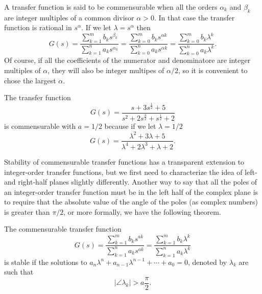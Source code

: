 \begin{definition}
  A transfer function is said to be commensurable when all the orders $\alpha_k$ and $\beta_k$ are integer multiples of a common divisor $\alpha > 0$. In that case the transfer function is rational in $s^\alpha$. If we let $\lambda = s^\alpha$ then
  \begin{equation*}
    G(s) = \frac{\sum_{k=1}^m b_k s^{\beta_k}}{\sum_{k=1}^n a_k s^{\alpha_k}} = \frac{\sum_{k=0}^m b_k s^{\alpha k}}{\sum_{k=0}^n a_k s^{\alpha k}} = 
    \frac{\sum_{k=0}^m b_k \lambda^{k}}{\sum_{k=0}^n a_k \lambda^{k}}.
  \end{equation*}
  Of course, if all the coefficients of the numerator and denominatore are integer multiples of $\alpha$, they will also be integer multipes of $\alpha/2$, so it is convenient to chose the largest $\alpha$. 
  \label{def:commensurable}
\end{definition}

\begin{example}
  The transfer function
  \begin{equation*}
    G(s) = \frac{s + 3 s^\frac{1}{2} + 5}{s^2 + 2 s^\frac{3}{2} + s^\frac{1}{2} + 2}
  \end{equation*}
  is commensurable with $a = 1/2$ because if we let $\lambda = 1/2$
  \begin{equation*}
    G(s) = \frac{\lambda^2 + 3 \lambda + 5}{\lambda^4 + 2 \lambda^3 + \lambda + 2}.
  \end{equation*}
\end{example}

Stability of commensurable transfer functions has a transparent extension to integer-order transfer functions, but we first need to characterize the idea of left- and right-half planes slightly differently. Another way to say that all the poles of an integer-order transfer function must be in the left half of the complex plane is to require that the absolute value of the angle of the poles (as complex numbers) is greater than $\pi/2$, or more formally, we have the following theorem.

\begin{theorem}
  The commensurable transfer function
  \begin{equation*}
    G(s) =  \frac{\sum_{k=1}^m b_k s^{a k}}{\sum_{k=1}^n a_k s^{a k}} = 
    \frac{\sum_{k=1}^m b_k \lambda^{k}}{\sum_{k=1}^n a_k \lambda^{k}}
  \end{equation*}
  is stable if the solutions to $a_n \lambda^n + a_{n-1} \lambda^{n-1} + \cdots + a_0 = 0$, denoted by $\lambda_k$ are such that
  \begin{equation*}
    \left| \angle \lambda_k \right| > a \frac{\pi}{2}.
  \end{equation*}
  \label{th:commensurablestability}
\end{theorem}

